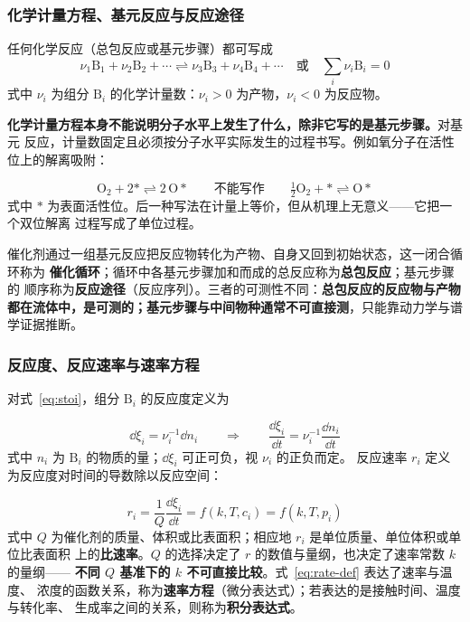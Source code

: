 \subsubsection{化学计量方程、基元反应与反应途径}

任何化学反应（总包反应或基元步骤）都可写成
\begin{equation}
\nu_1\mathrm{B}_1+\nu_2\mathrm{B}_2+\cdots \rightleftharpoons
\nu_3\mathrm{B}_3+\nu_4\mathrm{B}_4+\cdots
\quad\text{或}\quad \sum_i \nu_i\mathrm{B}_i=0
\label{eq:stoi}
\end{equation}
式中 $\nu_i$ 为组分 $\mathrm{B}_i$ 的化学计量数：$\nu_i>0$ 为产物，$\nu_i<0$ 为反应物。

\textbf{化学计量方程本身不能说明分子水平上发生了什么，除非它写的是基元步骤。}对基元
反应，计量数固定且必须按分子水平实际发生的过程书写。例如氧分子在活性位上的解离吸附：

\begin{equation}
\mathrm{O_2}+2* \rightleftharpoons 2\,\mathrm{O}{*}
\qquad\text{不能写作}\qquad
\tfrac{1}{2}\mathrm{O_2}+* \rightleftharpoons \mathrm{O}{*}
\label{eq:elem}
\end{equation}
式中 $*$ 为表面活性位。后一种写法在计量上等价，但从机理上无意义——它把一个双位解离
过程写成了单位过程。

催化剂通过一组基元反应把反应物转化为产物、自身又回到初始状态，这一闭合循环称为
\textbf{催化循环}；循环中各基元步骤加和而成的总反应称为\textbf{总包反应}；基元步骤的
顺序称为\textbf{反应途径}（反应序列）。三者的可测性不同：\textbf{总包反应的反应物与产物
都在流体中，是可测的；基元步骤与中间物种通常不可直接测}，只能靠动力学与谱学证据推断。

\subsubsection{反应度、反应速率与速率方程}

对式~\eqref{eq:stoi}，组分 $\mathrm{B}_i$ 的反应度定义为

\begin{equation}
\dd\xi_i=\nu_i^{-1}\dd n_i
\qquad\Longrightarrow\qquad
\frac{\dd\xi_i}{\dd t}=\nu_i^{-1}\frac{\dd n_i}{\dd t}
\label{eq:xi}
\end{equation}
式中 $n_i$ 为 $\mathrm{B}_i$ 的物质的量；$\dd\xi_i$ 可正可负，视 $\nu_i$ 的正负而定。
反应速率 $r_i$ 定义为反应度对时间的导数除以反应空间：

\begin{equation}
r_i=\frac{1}{Q}\frac{\dd\xi_i}{\dd t}
=f(k,T,c_i)=f(k,T,p_i)
\label{eq:rate-def}
\end{equation}
式中 $Q$ 为催化剂的质量、体积或比表面积；相应地 $r_i$ 是单位质量、单位体积或单位比表面积
上的\textbf{比速率}。$Q$ 的选择决定了 $r$ 的数值与量纲，也决定了速率常数 $k$ 的量纲——
\textbf{不同 $Q$ 基准下的 $k$ 不可直接比较}。式~\eqref{eq:rate-def} 表达了速率与温度、
浓度的函数关系，称为\textbf{速率方程}（微分表达式）；若表达的是接触时间、温度与转化率、
生成率之间的关系，则称为\textbf{积分表达式}。

